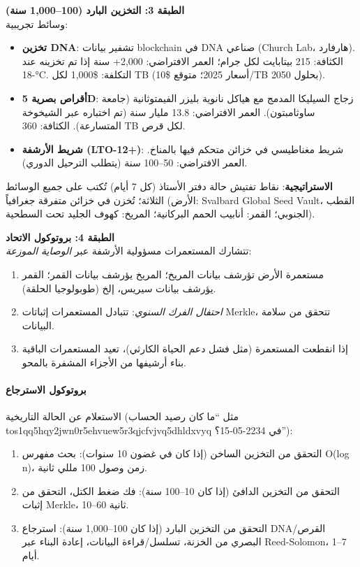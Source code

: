 \documentclass[11pt]{article}
\begin{document}
\textbf{الطبقة 3: التخزين البارد (100--1,000 سنة)}\\
وسائط تجريبية:
\begin{itemize}[noitemsep]
  \item \textbf{تخزين DNA}: تشفير بيانات blockchain في DNA صناعي (Church Lab، هارفارد). الكثافة: 215 بيتابايت لكل جرام؛ العمر الافتراضي: 2,000+ سنة إذا تم تخزينه عند -18°C. التكلفة: \$1,000 لكل TB (أسعار 2025؛ متوقع \$10/TB بحلول 2050).
  \item \textbf{أقراص بصرية 5D}: زجاج السيليكا المدمج مع هياكل نانوية بليزر الفيمتوثانية (جامعة ساوثامبتون). العمر الافتراضي: 13.8 مليار سنة (تم اختباره عبر الشيخوخة المتسارعة). الكثافة: 360 TB لكل قرص.
  \item \textbf{شريط الأرشفة (LTO-12+)}: شريط مغناطيسي في خزائن متحكم فيها بالمناخ. العمر الافتراضي: 50--100 سنة (يتطلب الترحيل الدوري).
\end{itemize}
\textbf{الاستراتيجية}: نقاط تفتيش حالة دفتر الأستاذ (كل 7 أيام) تُكتب على جميع الوسائط الثلاثة؛ تُخزن في خزائن متفرقة جغرافياً (الأرض: Svalbard Global Seed Vault، القطب الجنوبي؛ القمر: أنابيب الحمم البركانية؛ المريخ: كهوف الجليد تحت السطحية).

\textbf{الطبقة 4: بروتوكول الاتحاد}\\
تتشارك المستعمرات مسؤولية الأرشفة عبر \emph{الوصاية الموزعة}:
\begin{enumerate}[noitemsep]
  \item مستعمرة الأرض تؤرشف بيانات المريخ؛ المريخ يؤرشف بيانات القمر؛ القمر يؤرشف بيانات سيريس، إلخ (طوبولوجيا الحلقة).
  \item \emph{احتفال الفرك السنوي}: تتبادل المستعمرات إثباتات Merkle، تتحقق من سلامة البيانات.
  \item إذا انقطعت المستعمرة (مثل فشل دعم الحياة الكارثي)، تعيد المستعمرات الباقية بناء أرشيفها من الأجزاء المشفرة بالمحو.
\end{enumerate}

\paragraph{بروتوكول الاسترجاع}
الاستعلام عن الحالة التاريخية (مثل ``ما كان رصيد الحساب tos1qq5hqy2jwn0r5ehvuew5r3qjcfvjvq5dhldxvyq في 2234-05-15؟''):
\begin{enumerate}[noitemsep]
  \item التحقق من التخزين الساخن (إذا كان في غضون 10 سنوات): بحث مفهرس O(log n)، زمن وصول 100 مللي ثانية.
  \item التحقق من التخزين الدافئ (إذا كان 10--100 سنة): فك ضغط الكتل، التحقق من إثبات Merkle، 10--60 ثانية.
  \item التحقق من التخزين البارد (إذا كان 100--1,000 سنة): استرجاع DNA/القرص البصري من الخزنة، تسلسل/قراءة البيانات، إعادة البناء عبر Reed-Solomon، 1--7 أيام.
\end{enumerate}
\end{document}
